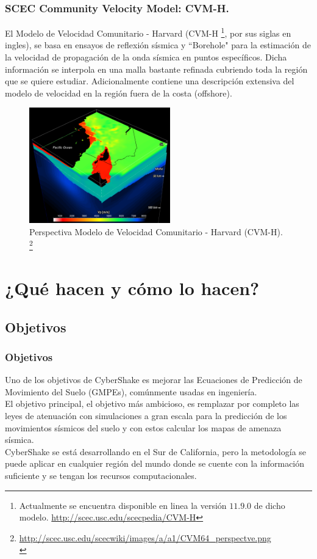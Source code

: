 \documentclass{beamer}
\begin{document}
%
%
\begin{frame}[allowframebreaks]
\frametitle{SCEC Community Velocity Model: CVM-H.}
%
\justifying
%
El Modelo de Velocidad Comunitario - Harvard (CVM-H \footnote{\tiny Actualmente se encuentra disponible en linea la versión $11.9.0$ de dicho modelo. \url{http://scec.usc.edu/scecpedia/CVM-H}}, por sus siglas en ingles), se basa en ensayos de reflexión sísmica y ``Borehole" para la estimación de la velocidad de propagación de la onda sísmica en puntos específicos. Dicha información se interpola en una malla bastante refinada cubriendo toda la región que se quiere estudiar. Adicionalmente contiene una descripción extensiva del modelo de velocidad en la región fuera de la costa (offshore).
%
\begin{figure}[h]
	\centering
	\includegraphics[height=5cm]{img/CVM64_perspectve.pdf}
	\caption{Perspectiva Modelo de Velocidad Comunitario - Harvard (CVM-H). \footnote{\tiny\url{http://scec.usc.edu/scecwiki/images/a/a1/CVM64_perspectve.png}\\}}
\end{figure}
%
%
\end{frame}
%
%
\section{¿Qué hacen y cómo lo hacen?}
\subsection{Objetivos}
\begin{frame}%
\frametitle{Objetivos}
%
\justifying
%
Uno de los objetivos de CyberShake es mejorar las Ecuaciones de Predicción de Movimiento del Suelo (GMPEs), comúnmente usadas en ingeniería.\\
%
El objetivo principal, el objetivo más ambicioso, es remplazar por completo las leyes de atenuación con simulaciones a gran escala para la predicción de los movimientos sísmicos del suelo y con estos calcular los mapas de amenaza sísmica.\\
%
CyberShake se está desarrollando en el Sur de California, pero la metodología se puede aplicar en cualquier región del mundo donde se cuente con la información suficiente y se tengan los recursos computacionales.
%
%
\end{frame}
%
%
\end{document}
